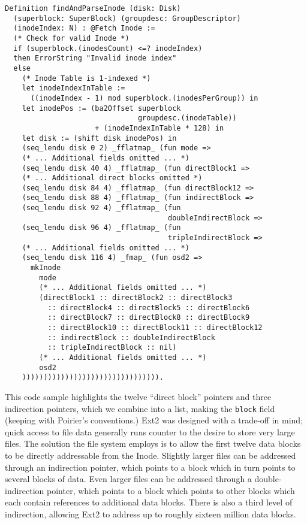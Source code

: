 \documentclass[nocopyrightspace]{sigplanconf}
\begin{document}
\begin{lstlisting}
Definition findAndParseInode (disk: Disk) 
  (superblock: SuperBlock) (groupdesc: GroupDescriptor)
  (inodeIndex: N) : @Fetch Inode :=
  (* Check for valid Inode *)
  if (superblock.(inodesCount) <=? inodeIndex)
  then ErrorString "Invalid inode index"
  else
    (* Inode Table is 1-indexed *)
    let inodeIndexInTable := 
      ((inodeIndex - 1) mod superblock.(inodesPerGroup)) in
    let inodePos := (ba2Offset superblock
                               groupdesc.(inodeTable))
                     + (inodeIndexInTable * 128) in
    let disk := (shift disk inodePos) in
    (seq_lendu disk 0 2) _fflatmap_ (fun mode =>
    (* ... Additional fields omitted ... *)
    (seq_lendu disk 40 4) _fflatmap_ (fun directBlock1 =>
    (* ... Additional direct blocks omitted *)
    (seq_lendu disk 84 4) _fflatmap_ (fun directBlock12 =>
    (seq_lendu disk 88 4) _fflatmap_ (fun indirectBlock =>
    (seq_lendu disk 92 4) _fflatmap_ (fun 
                                      doubleIndirectBlock =>
    (seq_lendu disk 96 4) _fflatmap_ (fun 
                                      tripleIndirectBlock =>
    (* ... Additional fields omitted ... *)
    (seq_lendu disk 116 4) _fmap_ (fun osd2 =>
      mkInode
        mode
        (* ... Additional fields omitted ... *)
        (directBlock1 :: directBlock2 :: directBlock3
          :: directBlock4 :: directBlock5 :: directBlock6
          :: directBlock7 :: directBlock8 :: directBlock9
          :: directBlock10 :: directBlock11 :: directBlock12
          :: indirectBlock :: doubleIndirectBlock
          :: tripleIndirectBlock :: nil)
        (* ... Additional fields omitted ... *)
        osd2
    )))))))))))))))))))))))))))))))).
\end{lstlisting}

This code sample highlights the twelve ``direct block'' pointers and three
indirection pointers, which we combine into a list, making the {\tt block}
field (keeping with Poirier's conventions.) Ext2 was designed with a trade-off
in mind; quick access to file data generally runs counter to the desire to
store very large files.  The solution the file system employs is to allow the
first twelve data blocks to be directly addressable from the Inode. Slightly
larger files can be addressed through an indirection pointer, which points to
a block which in turn points to several blocks of data. Even larger files can
be addressed through a double-indirection pointer, which points to a block
which points to other blocks which each contain references to additional data
blocks. There is also a third level of indirection, allowing Ext2 to address
up to roughly sixteen million data blocks.
\end{document}
